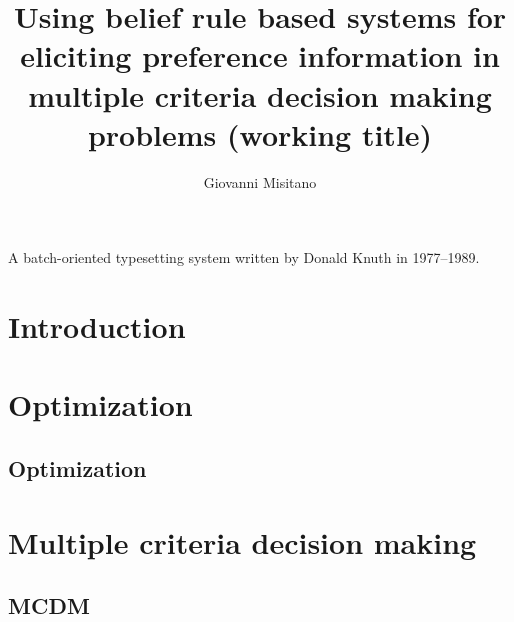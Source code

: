 \documentclass[utf8,english]{gradu3}
\begin{document}
\title{Using belief rule based systems for eliciting preference information in multiple criteria decision making problems (working title)}

\author{Giovanni Misitano}


\maketitle

\begin{thetermlist}
\item[\TeX] A batch-oriented typesetting system written by 
Donald Knuth in 1977--1989.
\end{thetermlist}

\mainmatter

\chapter{Introduction}


\chapter{Optimization}

\section{Optimization}

\cite{ko_practical_2015}\cite{yang_optimization_2007-1}

\chapter{Multiple criteria decision making}

\section{MCDM}

\end{document}
